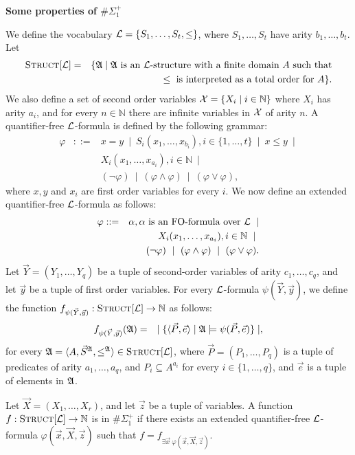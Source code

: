 \documentclass[12pt]{article}
\def\E1{\#\Sigma_1^{+}}
\def\Truc{\textsc{Struct}[\L]}
\def\A{{\frak A}}
\def\L{{\cal L}}
\def\N{\mathbb{N}}
\def\P{\vec{P}}
\def\S{\vec{S}}
\def\X{\vec{X}}
\def\Y{\vec{Y}}
\def\e{\vec{e}} %
\def\x{\vec{x}} %
\def\y{\vec{y}} %
\def\z{\vec{z}} %
\begin{document}
\begin{center}
{ \LARGE \bf
  Some properties of $\E1$
}
\end{center}

We define the vocabulary $\L = \{ S_1,\dots,S_t, \leq \}$, where $S_1,\dots,S_t$ have arity $b_1,\dots,b_t$. Let
\begin{eqnarray*}
\Truc &=& \{\A \mid \A \text{ is an } \L \text{-structure with a finite domain } A \text{ such that} \\
&& \leq \text{ is interpreted as a total order for } A \}.
\end{eqnarray*}
We also define a set of second order variables ${\cal X} = \{ X_i \mid i\in\N \}$ where $X_i$ has arity $a_i$, and for every $n \in \N$ there are infinite variables in ${\cal X}$ of arity $n$. A quantifier-free $\L$-formula is defined by the following grammar:
\begin{eqnarray*}
\varphi &::=& x = y \ \mid \ S_i(x_1,\dots,x_{b_i}), i \in \{1,\dots,t\} \ \mid \ x \leq y \ \mid \\
&& X_i(x_1,\dots,x_{a_i}), i\in\N \ \mid \\ 
&& (\neg \varphi) \ \mid \ (\varphi \wedge \varphi) \ \mid \ (\varphi \vee \varphi),
\end{eqnarray*}
where $x,y$ and $x_i$ are first order variables for every $i$. We now define an extended quantifier-free $\L$-formula as follows:
\begin{eqnarray*}
\varphi &::=& \alpha, \alpha \text{ is an FO-formula over } \L  \ \mid \\
&& X_i(x_1,\dots,x_{a_i}), i\in\N \ \mid \ \\
&& (\neg \varphi) \ \mid \ (\varphi \wedge \varphi) \ \mid \ (\varphi \vee \varphi).
\end{eqnarray*}
Let $\Y = (Y_1,\dots,Y_q)$ be a tuple of second-order variables of arity $c_1,\ldots,c_q$, and let $\y$ be a tuple of first order variables. For every $\L$-formula $\psi(\Y,\y)$, we define the function $f_{\psi(\Y,\y)}:\Truc \to \N$ as follows:
\begin{eqnarray*}
f_{\psi(\Y,\y)}(\A) &=& \mid \{ \langle \P, \e \rangle \mid \A \models \psi(\P,\e) \} \mid,
\end{eqnarray*}
for every $\A = \langle A, \S^{\A}, \leq^{\A} \rangle \in \Truc$, where $\P = (P_1,\ldots,P_q)$ is a tuple of predicates of arity $a_1,\ldots,a_q$, and $P_i \subseteq A^{a_i}$ for every $i \in \{1,\ldots,q\}$, and $\e$ is a tuple of elements in $\A$.

Let $\X = (X_1,\dots,X_r)$, and let $\z$ be a tuple of variables. A function $f:\Truc \to \N$ is in $\E1$ if there exists an extended quantifier-free $\L$-formula $\varphi(\x,\X,\z)$ such that $f = f_{\exists \x \: \varphi(\x,\X,\z)}.$\\
\end{document}
